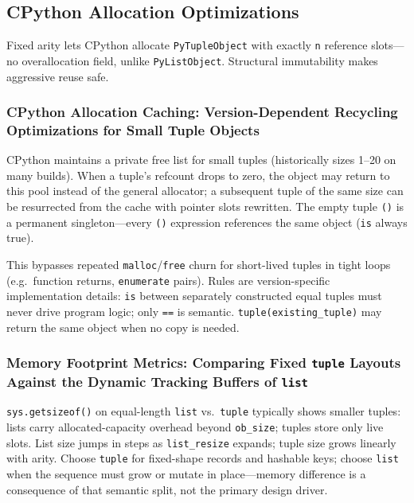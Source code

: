 \subsection{CPython Allocation Optimizations}

Fixed arity lets CPython allocate \texttt{PyTupleObject} with exactly \texttt{n} reference slots---no overallocation field, unlike \texttt{PyListObject}. Structural immutability makes aggressive reuse safe.

\subsubsection{CPython Allocation Caching: Version-Dependent Recycling Optimizations for Small Tuple Objects}

CPython maintains a private free list for small tuples (historically sizes 1--20 on many builds). When a tuple's refcount drops to zero, the object may return to this pool instead of the general allocator; a subsequent tuple of the same size can be resurrected from the cache with pointer slots rewritten. The empty tuple \texttt{()} is a permanent singleton---every \texttt{()} expression references the same object (\texttt{is} always true).

This bypasses repeated \texttt{malloc}/\texttt{free} churn for short-lived tuples in tight loops (e.g.\ function returns, \texttt{enumerate} pairs). Rules are version-specific implementation details: \texttt{is} between separately constructed equal tuples must never drive program logic; only \texttt{==} is semantic. \texttt{tuple(existing\_tuple)} may return the same object when no copy is needed.

\subsubsection{Memory Footprint Metrics: Comparing Fixed \texttt{tuple} Layouts Against the Dynamic Tracking Buffers of \texttt{list}}

\texttt{sys.getsizeof()} on equal-length \texttt{list} vs.\ \texttt{tuple} typically shows smaller tuples: lists carry allocated-capacity overhead beyond \texttt{ob\_size}; tuples store only live slots. List size jumps in steps as \texttt{list\_resize} expands; tuple size grows linearly with arity. Choose \texttt{tuple} for fixed-shape records and hashable keys; choose \texttt{list} when the sequence must grow or mutate in place---memory difference is a consequence of that semantic split, not the primary design driver.
